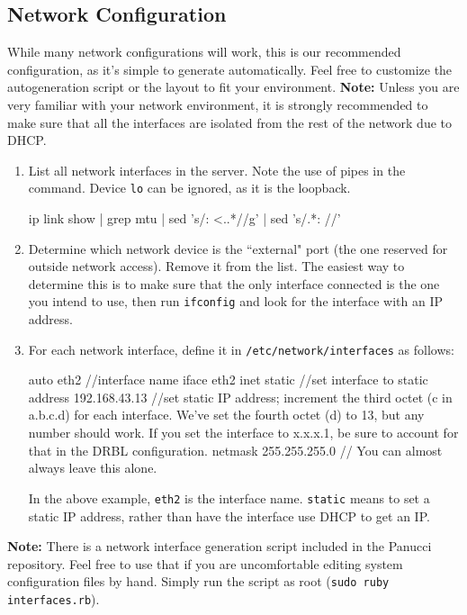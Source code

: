 \documentclass{article}
\def\code#1{\texttt{#1}}
\begin{document}
\begin{flushleft}
\subsection{Network Configuration}
While many network configurations will work, this is our recommended configuration, as it's simple to generate automatically.  Feel free to customize the autogeneration script or the layout to fit your environment.\linebreak
\textbf{Note:} Unless you are very familiar with your network environment, it is strongly recommended to make sure that all the interfaces are isolated from the rest of the network due to DHCP.
\begin{enumerate}
  \item List all network interfaces in the server.  Note the use of pipes in the command.  Device \code{lo} can be ignored, as it is the loopback.
  \begin{spverbatim}
ip link show | grep mtu | sed 's/: <..*//g' | sed 's/.*: //'
  \end{spverbatim}
  \item Determine which network device is the ``external" port (the one reserved for outside network access).  Remove it from the list.  The easiest way to determine this is to make sure that the only interface connected is the one you intend to use, then run \code{ifconfig} and look for the interface with an IP address.
  \item For each network interface, define it in \code{/etc/network/interfaces} as follows:
  \begin{spverbatim}
auto eth2 //interface name
iface eth2 inet static //set interface to static
address 192.168.43.13 //set static IP address; increment the third octet (c in a.b.c.d) for each interface.  We've set the fourth octet (d) to 13, but any number should work.  If you set the interface to x.x.x.1, be sure to account for that in the DRBL configuration.
netmask 255.255.255.0 // You can almost always leave this alone.
  \end{spverbatim}\linebreak
In the above example, \code{eth2} is the interface name.  \code{static} means to set a static IP address, rather than have the interface use DHCP to get an IP.
\end{enumerate}
\textbf{Note:} There is a network interface generation script included in the Panucci repository.  Feel free to use that if you are uncomfortable editing system configuration files by hand.  Simply run the script as root (\code{sudo ruby interfaces.rb}).
\end{flushleft}
\end{document}
